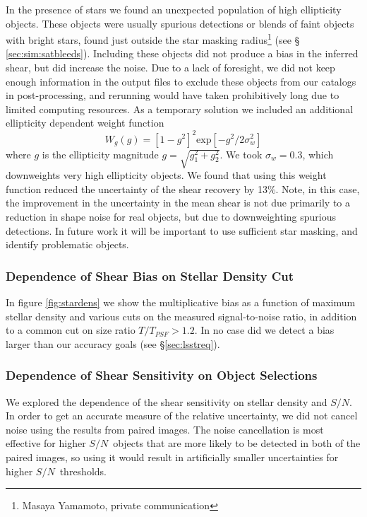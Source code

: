 \documentclass[twocolumn,twocolappendix,astrosym]{openjournal}
\newcommand{\snr}{$S/N$}
\begin{document}
In the presence of stars we found an unexpected population of high ellipticity
objects.  These objects were usually spurious detections or blends of faint
objects with bright stars, found just outside the star masking
radius\footnote{Masaya Yamamoto, private communication} (see \S
\ref{sec:sim:satbleeds}).  Including these objects did not produce a bias in
the inferred shear, but did increase the noise.  Due to a lack of foresight, we
did not keep enough information in the output files to exclude these objects
from our catalogs in post-processing, and rerunning would have taken
prohibitively long due to limited computing resources.  As a temporary solution
we included an additional ellipticity dependent weight function \citep{ba14}
\begin{equation}
    W_g(g) = \left[1 - g^2\right]^2 \mathrm{exp}\left[ -g^2/2 \sigma_w^2\right]
\end{equation}
where $g$ is the ellipticity magnitude $g = \sqrt{g_1^2 + g_2^2}$.  We took
$\sigma_w = 0.3$, which downweights very high ellipticity objects.  We found
that using this weight function reduced the uncertainty of the shear recovery
by 13\%.  Note, in this case, the improvement in the uncertainty in the mean
shear is not due primarily to a reduction in shape noise for real objects, but
due to downweighting spurious detections.  In future work it will be important
to use sufficient star masking, and identify problematic objects.

\subsubsection{Dependence of Shear Bias on Stellar Density Cut} \label{sec:results:sdens}

In figure \ref{fig:stardens} we show the multiplicative bias as a function of
maximum stellar density and various cuts on the measured signal-to-noise ratio,
in addition to a common cut on size ratio $T/T_{PSF} > 1.2$.  In no case did we
detect a bias larger than our accuracy goals (see \S \ref{sec:lsstreq}).




\subsubsection{Dependence of Shear Sensitivity on Object Selections}
\label{sec:results:sdensnoise}

We explored the dependence of the shear sensitivity on stellar density and
\snr.  In order to get an accurate measure of the relative uncertainty, we did
not cancel noise using the results from paired images.  The noise cancellation
is most effective for higher \snr\ objects that are more likely to be detected
in both of the paired images, so using it would result in artificially smaller
uncertainties for higher \snr\ thresholds.
\end{document}
